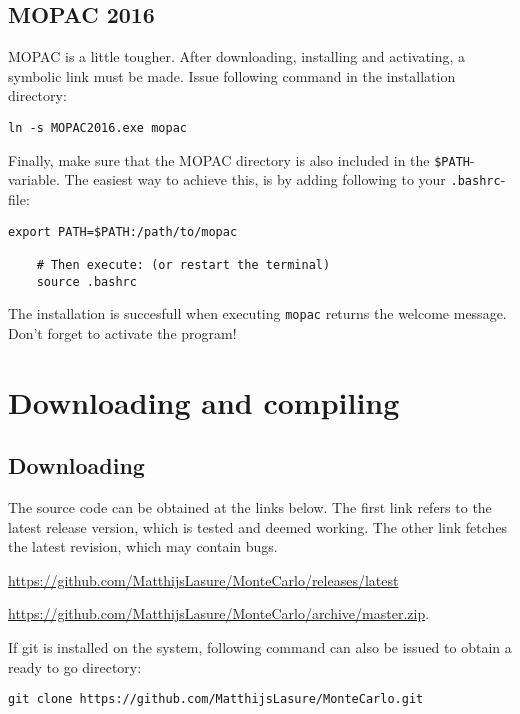 	\subsection{MOPAC 2016}
	MOPAC\cite{mopac} is a little tougher. After downloading, installing and 
	activating, a 
	symbolic link must be made. Issue following command in the installation 
	directory:
	
	\begin{lstlisting}[caption=Symlink to MOPAC]
	ln -s MOPAC2016.exe mopac
	\end{lstlisting}
	
	Finally, make sure that the MOPAC directory is also included in the 
	\verb|$PATH|-variable. The easiest way to achieve this, is by adding 
	following 
	to your \verb|.bashrc|-file:
	\begin{lstlisting}[caption=changing the path variable]
	export PATH=$PATH:/path/to/mopac
	
	# Then execute: (or restart the terminal)
	source .bashrc
	\end{lstlisting}
	
	The installation is succesfull when executing \verb|mopac| returns the 
	welcome 
	message. Don't forget to activate the program!
	
	\section{Downloading and compiling}
	
	\subsection{Downloading}
	The source code can be obtained at the links below. The first link refers 
	to 
	the latest release version, which is tested and deemed working. The other 
	link 
	fetches the latest revision, which may contain bugs.
	
	\url{https://github.com/MatthijsLasure/MonteCarlo/releases/latest}
	
	\url{https://github.com/MatthijsLasure/MonteCarlo/archive/master.zip}.
	
	If git is installed on the system, following command can also be issued to 
	obtain a ready to go directory:
	
	\begin{lstlisting}[caption=Clone with git]
	git clone https://github.com/MatthijsLasure/MonteCarlo.git
	\end{lstlisting}
	
